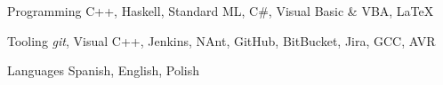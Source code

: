 
\begin{cvskills}

  \cvskill
    {Programming} %
    {C++, Haskell, Standard ML, C\#, Visual Basic \& VBA, LaTeX} %

  \cvskill
    {Tooling} %
    {\textit{git}, Visual C++, Jenkins, NAnt, GitHub, BitBucket, Jira, GCC, AVR} %

  \cvskill
    {Languages} %
    {Spanish, English, Polish} %

\end{cvskills}